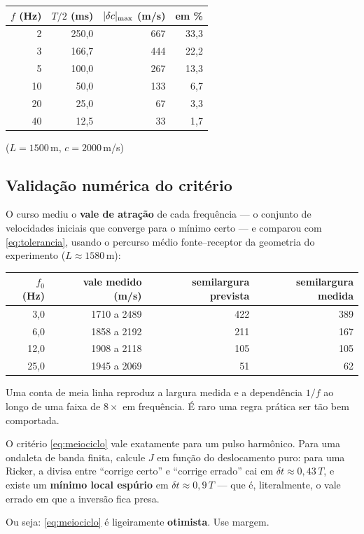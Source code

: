 \documentclass[11pt,a4paper,oneside]{report}
\begin{document}
\begin{center}
\begin{tabular}{@{}rrrr@{}}
\toprule
$f$ (Hz) & $T/2$ (ms) & $\lvert \delta c \rvert_{\max}$ (m/s) & em \% \\
\midrule
2  & 250{,}0 & 667 & 33{,}3 \\
3  & 166{,}7 & 444 & 22{,}2 \\
5  & 100{,}0 & 267 & 13{,}3 \\
10 & 50{,}0  & 133 & 6{,}7 \\
20 & 25{,}0  & 67  & 3{,}3 \\
40 & 12{,}5  & 33  & 1{,}7 \\
\bottomrule
\end{tabular}
\end{center}
{\small ($L = 1500$\,m, $c = 2000$\,m/s)}

\subsection*{Valida\c{c}\~ao num\'erica do crit\'erio}

O curso mediu o \textbf{vale de atra\c{c}\~ao} de cada frequ\^encia --- o
conjunto de velocidades iniciais que converge para o m\'inimo certo --- e
comparou com \eqref{eq:tolerancia}, usando o percurso m\'edio
fonte--receptor da geometria do experimento ($L \approx 1580$\,m):

\begin{center}
\begin{tabular}{@{}rrrr@{}}
\toprule
$f_0$ (Hz) & vale medido (m/s) & semilargura prevista & semilargura medida \\
\midrule
3{,}0  & 1710 a 2489 & 422 & 389 \\
6{,}0  & 1858 a 2192 & 211 & 167 \\
12{,}0 & 1908 a 2118 & 105 & 105 \\
25{,}0 & 1945 a 2069 & 51  & 62 \\
\bottomrule
\end{tabular}
\end{center}

Uma conta de meia linha reproduz a largura medida e a depend\^encia $1/f$ ao
longo de uma faixa de $8\times$ em frequ\^encia. \'E raro uma regra
pr\'atica ser t\~ao bem comportada.

\begin{atencao}
O crit\'erio \eqref{eq:meiociclo} vale exatamente para um pulso harm\^onico.
Para uma ondaleta de banda finita, calcule $J$ em fun\c{c}\~ao do
deslocamento puro: para uma Ricker, a divisa entre ``corrige certo'' e
``corrige errado'' cai em $\delta t \approx 0{,}43\,T$, e existe um
\textbf{m\'inimo local esp\'urio} em $\delta t \approx 0{,}9\,T$ --- que \'e,
literalmente, o vale errado em que a invers\~ao fica presa.

Ou seja: \eqref{eq:meiociclo} \'e ligeiramente \textbf{otimista}. Use margem.
\end{atencao}
\end{document}
